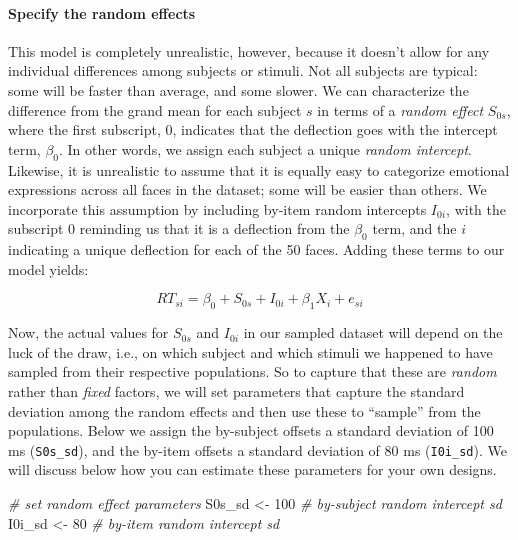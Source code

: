 \documentclass[man,floatsintext]{apa6}
\newenvironment{Shaded}{\begin{snugshade}}{\end{snugshade}}
\newcommand{\CommentTok}[1]{\textcolor[rgb]{0.56,0.35,0.01}{\textit{#1}}}
\newcommand{\DecValTok}[1]{\textcolor[rgb]{0.00,0.00,0.81}{#1}}
\newcommand{\NormalTok}[1]{#1}
\newcommand{\StringTok}[1]{\textcolor[rgb]{0.31,0.60,0.02}{#1}}
\let\oldparagraph\paragraph
\renewcommand{\paragraph}[1]{\oldparagraph{#1}\mbox{}}
\begin{document}
\hypertarget{specify-the-random-effects}{%
\paragraph{Specify the random effects}\label{specify-the-random-effects}}

This model is completely unrealistic, however, because it doesn't allow for any individual differences among subjects or stimuli. Not all subjects are typical: some will be faster than average, and some slower. We can characterize the difference from the grand mean for each subject \(s\) in terms of a \emph{random effect} \(S_{0s}\), where the first subscript, 0, indicates that the deflection goes with the intercept term, \(\beta_0\). In other words, we assign each subject a unique \emph{random intercept}. Likewise, it is unrealistic to assume that it is equally easy to categorize emotional expressions across all faces in the dataset; some will be easier than others. We incorporate this assumption by including by-item random intercepts \(I_{0i}\), with the subscript 0 reminding us that it is a deflection from the \(\beta_0\) term, and the \(i\) indicating a unique deflection for each of the 50 faces. Adding these terms to our model yields:

\begin{equation}
RT_{si} = \beta_0 + S_{0s} + I_{0i} + \beta_1 X_i + e_{si}
\end{equation}

Now, the actual values for \(S_{0s}\) and \(I_{0i}\) in our sampled dataset will depend on the luck of the draw, i.e., on which subject and which stimuli we happened to have sampled from their respective populations. So to capture that these are \emph{random} rather than \emph{fixed} factors, we will set parameters that capture the standard deviation among the random effects and then use these to \enquote{sample} from the populations. Below we assign the by-subject offsets a standard deviation of 100 ms (\texttt{S0s\_sd}), and the by-item offsets a standard deviation of 80 ms (\texttt{I0i\_sd}). We will discuss below how you can estimate these parameters for your own designs.

\begin{Shaded}
\begin{Highlighting}[]
\CommentTok{# set random effect parameters}
\NormalTok{S0s_sd <-}\StringTok{ }\DecValTok{100} \CommentTok{# by-subject random intercept sd}
\NormalTok{I0i_sd <-}\StringTok{  }\DecValTok{80} \CommentTok{# by-item random intercept sd}
\end{Highlighting}
\end{Shaded}
\end{document}
